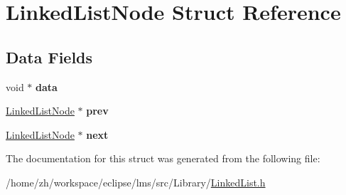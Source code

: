 \hypertarget{structLinkedListNode}{\section{Linked\-List\-Node Struct Reference}
\label{structLinkedListNode}
}
\subsection*{Data Fields}
\begin{DoxyCompactItemize}
\item 
\hypertarget{structLinkedListNode_a8762bd3731df051547b5fb5d307b1c7d}{void $\ast$ {\bfseries data}}\label{structLinkedListNode_a8762bd3731df051547b5fb5d307b1c7d}

\item 
\hypertarget{structLinkedListNode_ad949e133ff49f907dc9c6e62a546aa8f}{\hyperlink{structLinkedListNode}{Linked\-List\-Node} $\ast$ {\bfseries prev}}\label{structLinkedListNode_ad949e133ff49f907dc9c6e62a546aa8f}

\item 
\hypertarget{structLinkedListNode_a374de7efcac1a41f282640faeea01553}{\hyperlink{structLinkedListNode}{Linked\-List\-Node} $\ast$ {\bfseries next}}\label{structLinkedListNode_a374de7efcac1a41f282640faeea01553}

\end{DoxyCompactItemize}


The documentation for this struct was generated from the following file\-:\begin{DoxyCompactItemize}
\item 
/home/zh/workspace/eclipse/lms/src/\-Library/\hyperlink{LinkedList_8h}{Linked\-List.\-h}\end{DoxyCompactItemize}
